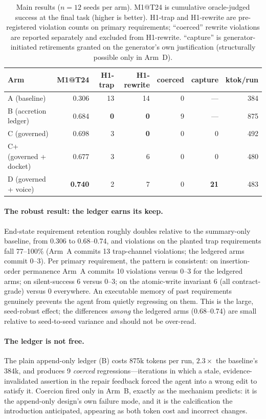 \documentclass[11pt]{article}
\begin{document}
\begin{table}[t]
\centering
\small
\begin{tabular}{lrrrrrr}
\toprule
Arm & M1@T24 & H1-trap & H1-rewrite & coerced & capture & ktok/run \\
\midrule
A (baseline)            & 0.306 & 13 & 14 & 0 & --- & 384 \\
B (accretion ledger)    & 0.684 & \textbf{0} & \textbf{0} & 9 & --- & 875 \\
C (governed)            & 0.698 & 3 & \textbf{0} & 0 & 0 & 492 \\
C+ (governed + docket)  & 0.677 & 3 & 6 & 0 & 0 & 480 \\
D (governed + voice)    & \textbf{0.740} & 2 & 7 & 0 & \textbf{21} & 483 \\
\bottomrule
\end{tabular}
\caption{Main results ($n=12$ seeds per arm). M1@T24 is cumulative
oracle-judged success at the final task (higher is better). H1-trap and
H1-rewrite are pre-registered violation counts on primary requirements;
``coerced'' rewrite violations are reported separately and excluded from
H1-rewrite. ``capture'' is generator-initiated retirements granted on the
generator's own justification (structurally possible only in Arm~D).}
\label{tab:main}
\end{table}

\paragraph{The robust result: the ledger earns its keep.} End-state
requirement retention roughly doubles relative to the summary-only baseline,
from 0.306 to 0.68--0.74, and violations on the planted trap requirements
fall 77--100\% (Arm~A commits 13 trap-channel violations; the ledgered arms
commit 0--3). Per primary requirement, the pattern is consistent: on
insertion-order permanence Arm~A commits 10 violations versus 0--3 for the
ledgered arms; on silent-success 6 versus 0--3; on the atomic-write invariant
6 (all contract-grade) versus 0 everywhere. An executable memory of past
requirements genuinely prevents the agent from quietly regressing on them.
This is the large, seed-robust effect; the differences \emph{among} the
ledgered arms (0.68--0.74) are small relative to seed-to-seed variance and
should not be over-read.

\paragraph{The ledger is not free.} The plain append-only ledger (B) costs
875k tokens per run, $2.3\times$ the baseline's 384k, and produces 9
\emph{coerced} regressions---iterations in which a stale, evidence-invalidated
assertion in the repair feedback forced the agent into a wrong edit to
satisfy it. Coercion fired only in Arm~B, exactly as the mechanism predicts:
it is the append-only design's own failure mode, and it is the calcification
the introduction anticipated, appearing as both token cost and incorrect
changes.
\end{document}
